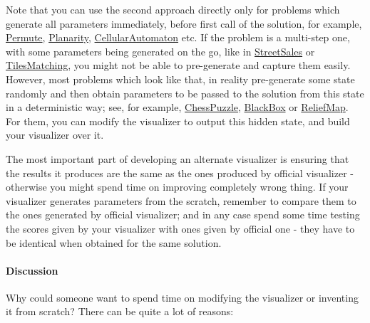 \documentclass[]{article}
\let\oldparagraph\paragraph
\renewcommand{\paragraph}[1]{\oldparagraph{#1}\mbox{}}
\begin{document}
Note that you can use the second approach directly only for problems
which generate all parameters immediately, before first call of the
solution, for example,
\href{http://www.topcoder.com/longcontest/?module=ViewProblemStatement\&rd=10932\&pm=8426}{Permute},
\href{http://www.topcoder.com/longcontest/?module=ViewProblemStatement\&rd=14272\&pm=10942}{Planarity},
\href{http://www.topcoder.com/longcontest/?module=ViewProblemStatement\&rd=14273\&pm=10989}{CellularAutomaton}
etc. If the problem is a multi-step one, with some parameters being
generated on the go, like in
\href{http://www.topcoder.com/longcontest/?module=ViewProblemStatement\&rd=14354\&pm=10034}{StreetSales}
or
\href{http://www.topcoder.com/longcontest/?module=ViewProblemStatement\&rd=13795\&pm=10410}{TilesMatching},
you might not be able to pre-generate and capture them easily. However,
most problems which look like that, in reality pre-generate some state
randomly and then obtain parameters to be passed to the solution from
this state in a deterministic way; see, for example,
\href{http://www.topcoder.com/longcontest/?module=ViewProblemStatement\&rd=14196\&pm=10728}{ChessPuzzle},
\href{http://www.topcoder.com/longcontest/?module=ViewProblemStatement\&rd=14208\&pm=10807}{BlackBox}
or
\href{http://www.topcoder.com/longcontest/?module=ViewProblemStatement\&rd=13766\&pm=10322}{ReliefMap}.
For them, you can modify the visualizer to output this hidden state, and
build your visualizer over it.

The most important part of developing an alternate visualizer is
ensuring that the results it produces are the same as the ones produced
by official visualizer - otherwise you might spend time on improving
completely wrong thing. If your visualizer generates parameters from the
scratch, remember to compare them to the ones generated by official
visualizer; and in any case spend some time testing the scores given by
your visualizer with ones given by official one - they have to be
identical when obtained for the same solution.

\hypertarget{discussion-1}{%
\paragraph{Discussion}\label{discussion-1}}

Why could someone want to spend time on modifying the visualizer or
inventing it from scratch? There can be quite a lot of reasons:
\end{document}
